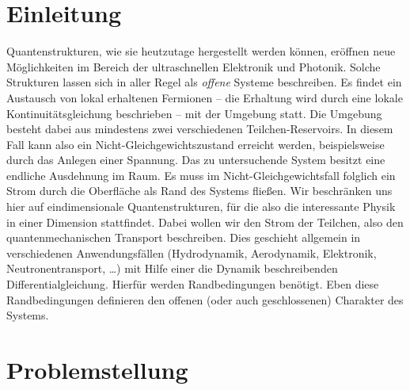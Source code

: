 \chapter{Einleitung}
Quantenstrukturen, wie sie heutzutage hergestellt werden können, eröffnen neue Möglichkeiten im Bereich der ultraschnellen Elektronik und Photonik. Solche Strukturen lassen sich in aller Regel als \emph{offene} Systeme beschreiben. Es findet ein Austausch von lokal erhaltenen Fermionen -- die Erhaltung wird durch eine lokale Kontinuitätsgleichung beschrieben -- mit der Umgebung statt. Die Umgebung besteht dabei aus mindestens zwei verschiedenen Teilchen-Reservoirs. In diesem Fall kann also ein Nicht-Gleichgewichtszustand erreicht werden, beispielsweise durch das Anlegen einer Spannung. Das zu untersuchende System besitzt eine endliche Ausdehnung im Raum. Es muss im Nicht-Gleichgewichtsfall folglich ein Strom durch die Oberfläche als Rand des Systems fließen. Wir beschränken uns hier auf eindimensionale Quantenstrukturen, für die also die interessante Physik in einer Dimension stattfindet. Dabei wollen wir den Strom der Teilchen, also den quantenmechanischen Transport beschreiben. Dies geschieht allgemein in verschiedenen Anwendungsfällen (Hydrodynamik, Aerodynamik, Elektronik, Neutronentransport, \dots) mit Hilfe einer die Dynamik beschreibenden Differentialgleichung. Hierfür werden Randbedingungen benötigt. Eben diese Randbedingungen definieren den offenen (oder auch geschlossenen) Charakter des Systems.

\chapter{Problemstellung}


